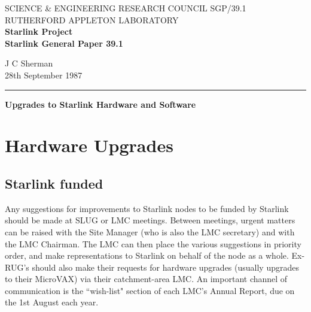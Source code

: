 \pagestyle{myheadings}
\setlength{\textwidth}{160mm}
\setlength{\textheight}{240mm}
\setlength{\topmargin}{-5mm}
\setlength{\oddsidemargin}{0mm}
\setlength{\evensidemargin}{0mm}
\setlength{\parindent}{0mm}
\setlength{\parskip}{\medskipamount}
\setlength{\unitlength}{1mm}


\thispagestyle{empty}
SCIENCE \& ENGINEERING RESEARCH COUNCIL \hfill SGP/39.1\\
RUTHERFORD APPLETON LABORATORY\\
{\large\bf Starlink Project\\}
{\large\bf Starlink General Paper 39.1}
\begin{flushright}
J C Sherman\\
28th September 1987
\end{flushright}
\vspace{-4mm}
\rule{\textwidth}{0.5mm}
\vspace{5mm}
\begin{center}
{\Large\bf Upgrades to Starlink Hardware and Software}
\end{center}
\vspace{5mm}

\section{Hardware Upgrades}

\subsection{Starlink funded}
Any suggestions for improvements to Starlink nodes to be funded by Starlink
should be made at SLUG or LMC meetings.
Between meetings, urgent matters can be raised with the Site Manager (who is
also the LMC secretary) and with the LMC Chairman.
The LMC can then place the various suggestions in priority order, and make
representations to Starlink on behalf of the node as a whole.
Ex-RUG's should also make their requests for hardware upgrades (usually upgrades
to their MicroVAX) via their catchment-area LMC.
An important channel of communication is the ``wish-list" section of each LMC's
Annual Report, due on the 1st August each year.

